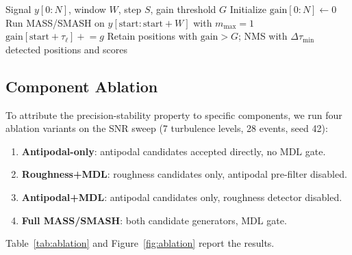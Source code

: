 \documentclass[12pt,letterpaper]{article}
\begin{document}
\begin{algorithm}[t]
\caption{MASS/SMASH chunked inference}
\label{alg:chunked}
\begin{algorithmic}[1]
\Require Signal $y[0:N]$, window $W$, step $S$, gain threshold $G$
\State Initialize $\mathrm{gain}[0:N] \gets 0$
  \State Run MASS/SMASH on $y[\mathrm{start}:\mathrm{start}+W]$ with $m_\mathrm{max}=1$
      \State $\mathrm{gain}[\mathrm{start}+\tau_\ell] \mathrel{+}= g$
    \EndFor
  \EndIf
\EndFor
\State Retain positions with $\mathrm{gain} > G$; NMS with $\Delta\tau_\mathrm{min}$
\State \Return detected positions and scores
\end{algorithmic}
\end{algorithm}

\subsection{Component Ablation}
\label{subsec:ablation}

To attribute the precision-stability property to specific components, we run
four ablation variants on the SNR sweep (7 turbulence levels, 28 events,
seed 42):

\begin{enumerate}
  \item \textbf{Antipodal-only}: antipodal candidates accepted directly,
    no MDL gate.
  \item \textbf{Roughness+MDL}: roughness candidates only, antipodal
    pre-filter disabled.
  \item \textbf{Antipodal+MDL}: antipodal candidates only, roughness
    detector disabled.
  \item \textbf{Full MASS/SMASH}: both candidate generators, MDL gate.
\end{enumerate}

Table~\ref{tab:ablation} and Figure~\ref{fig:ablation} report the results.
\end{document}
